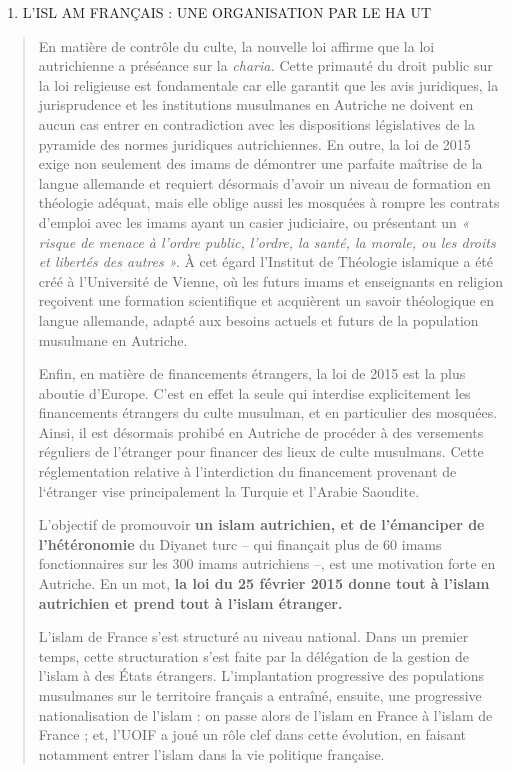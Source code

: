 \begin{enumerate}
\def\labelenumi{\Roman{enumi}.}
\setcounter{enumi}{1}
\item
  L'ISL AM FRANÇAIS : UNE ORGANISATION PAR LE HA UT
\end{enumerate}

\begin{quote}
En matière de contrôle du culte, la nouvelle loi affirme que la loi
autrichienne a préséance sur la \emph{charia.} Cette primauté du droit
public sur la loi religieuse est fondamentale car elle garantit que les
avis juridiques, la jurisprudence et les institutions musulmanes en
Autriche ne doivent en aucun cas entrer en contradiction avec les
dispositions législatives de la pyramide des normes juridiques
autrichiennes. En outre, la loi de 2015 exige non seulement des imams de
démontrer une parfaite maîtrise de la langue allemande et requiert
désormais d'avoir un niveau de formation en théologie adéquat, mais elle
oblige aussi les mosquées à rompre les contrats d'emploi avec les imams
ayant un casier judiciaire, ou présentant un \emph{« risque de menace à
l'ordre public, l'ordre, la santé, la morale, ou les droits et libertés
des autres ».} À cet égard l'Institut de Théologie islamique a été créé
à l'Université de Vienne, où les futurs imams et enseignants en religion
reçoivent une formation scientifique et acquièrent un savoir théologique
en langue allemande, adapté aux besoins actuels et futurs de la
population musulmane en Autriche.

Enfin, en matière de financements étrangers, la loi de 2015 est la plus
aboutie d'Europe. C'est en effet la seule qui interdise explicitement
les financements étrangers du culte musulman, et en particulier des
mosquées. Ainsi, il est désormais prohibé en Autriche de procéder à des
versements réguliers de l'étranger pour financer des lieux de culte
musulmans. Cette réglementation relative à l'interdiction du financement
provenant de l`étranger vise principalement la Turquie et l'Arabie
Saoudite.

L'objectif de promouvoir \textbf{un islam autrichien, et de l'émanciper
de l'hétéronomie} du Diyanet turc -- qui finançait plus de 60 imams
fonctionnaires sur les 300 imams autrichiens --, est une motivation
forte en Autriche. En un mot, \textbf{la loi du 25 février 2015 donne
tout à l'islam autrichien et prend tout à l'islam étranger.}

L'islam de France s'est structuré au niveau national. Dans un premier
temps, cette structuration s'est faite par la délégation de la gestion
de l'islam à des États étrangers. L'implantation progressive des
populations musulmanes sur le territoire français a entraîné, ensuite,
une progressive nationalisation de l'islam : on passe alors de l'islam
en France à l'islam de France ; et, l'UOIF a joué un rôle clef dans
cette évolution, en faisant notamment entrer l'islam dans la vie
politique française.


\end{quote}
